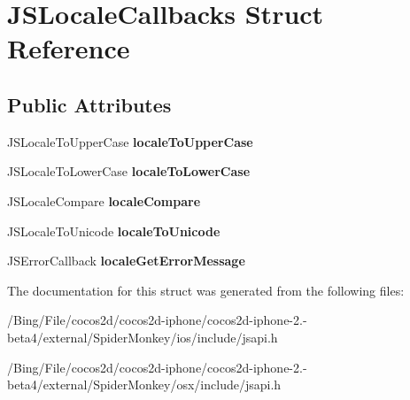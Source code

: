 \hypertarget{struct_j_s_locale_callbacks}{\section{J\-S\-Locale\-Callbacks Struct Reference}
\label{struct_j_s_locale_callbacks}
}
\subsection*{Public Attributes}
\begin{DoxyCompactItemize}
\item 
\hypertarget{struct_j_s_locale_callbacks_a6b2550539b47dd6496c0667a14272e28}{J\-S\-Locale\-To\-Upper\-Case {\bfseries locale\-To\-Upper\-Case}}\label{struct_j_s_locale_callbacks_a6b2550539b47dd6496c0667a14272e28}

\item 
\hypertarget{struct_j_s_locale_callbacks_a1b536ed8f9905acb52155dff7c190fde}{J\-S\-Locale\-To\-Lower\-Case {\bfseries locale\-To\-Lower\-Case}}\label{struct_j_s_locale_callbacks_a1b536ed8f9905acb52155dff7c190fde}

\item 
\hypertarget{struct_j_s_locale_callbacks_a457b8920cd2dad1f24261472e2a223a2}{J\-S\-Locale\-Compare {\bfseries locale\-Compare}}\label{struct_j_s_locale_callbacks_a457b8920cd2dad1f24261472e2a223a2}

\item 
\hypertarget{struct_j_s_locale_callbacks_a7e6513fa26b26dc17cb246956ba6c5be}{J\-S\-Locale\-To\-Unicode {\bfseries locale\-To\-Unicode}}\label{struct_j_s_locale_callbacks_a7e6513fa26b26dc17cb246956ba6c5be}

\item 
\hypertarget{struct_j_s_locale_callbacks_a42205b846716d6f11c329a859d405b0a}{J\-S\-Error\-Callback {\bfseries locale\-Get\-Error\-Message}}\label{struct_j_s_locale_callbacks_a42205b846716d6f11c329a859d405b0a}

\end{DoxyCompactItemize}


The documentation for this struct was generated from the following files\-:\begin{DoxyCompactItemize}
\item 
/\-Bing/\-File/cocos2d/cocos2d-\/iphone/cocos2d-\/iphone-\/2.-\/beta4/external/\-Spider\-Monkey/ios/include/jsapi.\-h\item 
/\-Bing/\-File/cocos2d/cocos2d-\/iphone/cocos2d-\/iphone-\/2.-\/beta4/external/\-Spider\-Monkey/osx/include/jsapi.\-h\end{DoxyCompactItemize}

